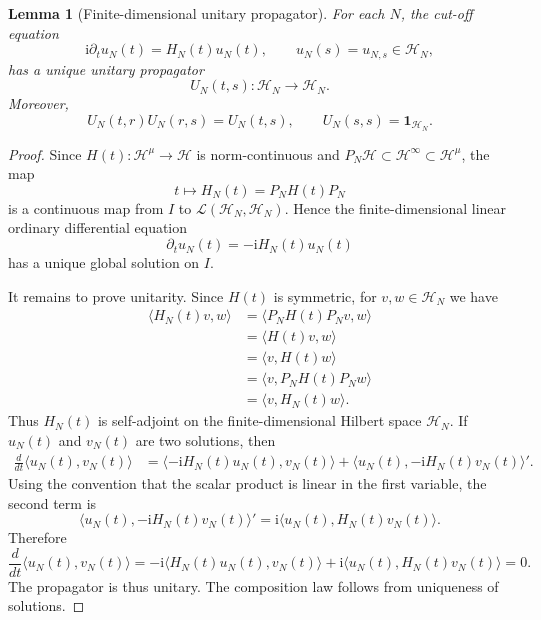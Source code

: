 \documentclass[10pt,a4paper]{amsart}
\newtheorem{lemma}[theorem]{Lemma}
\newcommand{\Hilb}{\mathcal H}
\newcommand{\Id}{\mathbf 1}
\newcommand{\ii}{\mathrm i}
\begin{document}
\begin{lemma}[Finite-dimensional unitary propagator]
\label{lem:finite-propagator}
For each \(N\), the cut-off equation
\[
        \ii\partial_t u_N(t)=H_N(t)u_N(t),
        \qquad
        u_N(s)=u_{N,s}\in\Hilb_N,
\]
has a unique unitary propagator
\[
        U_N(t,s):\Hilb_N\to\Hilb_N.
\]
Moreover,
\[
        U_N(t,r)U_N(r,s)=U_N(t,s),
        \qquad
        U_N(s,s)=\Id_{\Hilb_N}.
\]
\end{lemma}

\begin{proof}
Since \(H(t):\Hilb^\mu\to\Hilb\) is norm-continuous and
\(P_N\Hilb\subset \Hilb^\infty\subset \Hilb^\mu\), the map
\[
        t\longmapsto H_N(t)=P_NH(t)P_N
\]
is a continuous map from \(I\) to
\(\mathcal L(\Hilb_N,\Hilb_N)\).  Hence the finite-dimensional linear
ordinary differential equation
\[
        \partial_t u_N(t)=-\ii H_N(t)u_N(t)
\]
has a unique global solution on \(I\).

It remains to prove unitarity.  Since \(H(t)\) is symmetric, for
\(v,w\in\Hilb_N\) we have
\[
\begin{aligned}
        \langle H_N(t)v,w\rangle
        &=
        \langle P_NH(t)P_Nv,w\rangle        \\
        &=
        \langle H(t)v,w\rangle              \\
        &=
        \langle v,H(t)w\rangle              \\
        &=
        \langle v,P_NH(t)P_Nw\rangle        \\
        &=
        \langle v,H_N(t)w\rangle.
\end{aligned}
\]
Thus \(H_N(t)\) is self-adjoint on the finite-dimensional Hilbert space
\(\Hilb_N\).  If \(u_N(t)\) and \(v_N(t)\) are two solutions, then
\[
\begin{aligned}
        \frac{d}{dt}\langle u_N(t),v_N(t)\rangle
        &=
        \langle -\ii H_N(t)u_N(t),v_N(t)\rangle
        +
        \langle u_N(t),-\ii H_N(t)v_N(t)\rangle' .
\end{aligned}
\]
Using the convention that the scalar product is linear in the first
variable, the second term is
\[
        \langle u_N(t),-\ii H_N(t)v_N(t)\rangle'
        =
        \ii\langle u_N(t),H_N(t)v_N(t)\rangle.
\]
Therefore
\[
        \frac{d}{dt}\langle u_N(t),v_N(t)\rangle
        =
        -\ii\langle H_N(t)u_N(t),v_N(t)\rangle
        +
        \ii\langle u_N(t),H_N(t)v_N(t)\rangle
        =
        0.
\]
The propagator is thus unitary.  The composition law follows from
uniqueness of solutions.
\end{proof}
\end{document}
